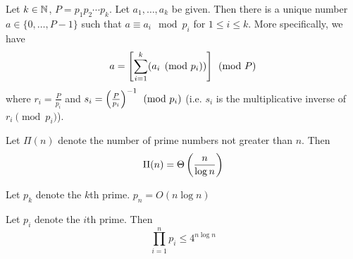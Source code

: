 \parinn
\begin{theorem}\label{crt}
	Let $k\in \mathbb{N}$, $P=p_1p_2\cdots p_k$. Let $a_1,\dots, a_k$ be given. Then there is a unique number $a\in \{0,\dots, P-1\}$ such that $a\equiv a_i\mod{p_i}$ for $1\leq i\leq k$. More specifically, we have $$a=\left[ \sum_{i=1}^k (a_i\pmod{p_i}) \right]\pmod{P}$$where $r_i=\frac{P}{p_i}$ and $s_i=\left(\frac{P}{p_i}\right)^{-1} \pmod{p_i}$ (i.e. $s_i$ is the multiplicative inverse of $r_i\pmod{p_i}$).
\end{theorem}
\begin{theorem}
	Let $\Pi(n)$ denote the number of prime numbers not greater than $n$. Then $$\Pi(n)=\Theta\left( \frac{n}{\log n}\right)$$
\end{theorem}
\begin{corollary}\label{approxpn}
	Let $p_k$ denote the $k$th prime. $p_n=O(n\log n)$
\end{corollary}
\begin{theorem}
	Let $p_i$ denote the $i$th prime. Then $$\prod_{i=1}^n p_i\leq 4^{n\log n}$$
\end{theorem}


